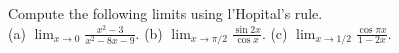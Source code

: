 Compute the following limits using l'Hopital's rule.\\
(a) $\displaystyle \lim_{x\to 0} \frac{x^2-3} {x^2-8x-9}$.\answercheck\hwendpart
(b) $\displaystyle\lim_{x\to \pi/2} \frac{\sin 2x} {\cos x}$.\answercheck\hwendpart
(c) $\displaystyle\lim_{x\to 1/2} \frac{\cos \pi x} {1-2x}$.\answercheck\hwendpart
